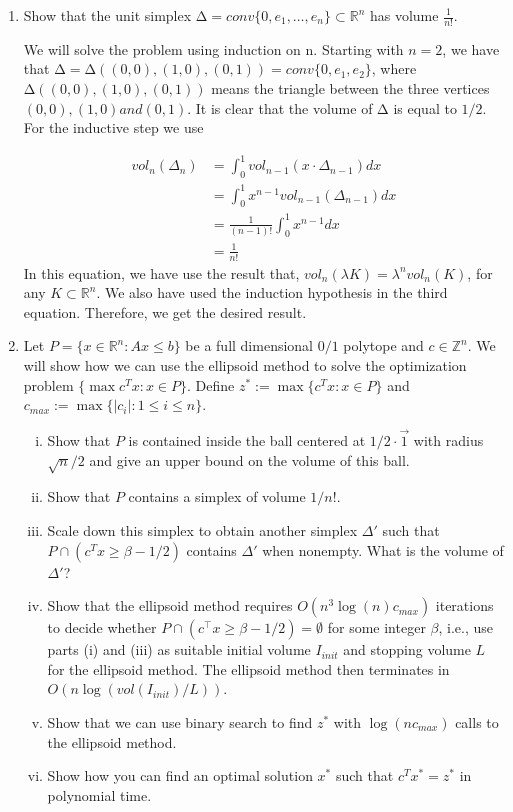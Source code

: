 \documentclass[11pt]{article}
\institute{\'Ecole Polytechnique F\'ed\'erale de Lausanne}
\newcommand{\setR}{\mathbb{R}}
\newcommand{\setZ}{\mathbb{Z}}
\renewcommand{\geq}{\geqslant}
\begin{document}
\makeheader

\begin{enumerate}[1)]

\item Show that the unit simplex $∆ = conv\{0,e_1,\hdots,e_n\}⊂\setR^n$ has volume $\frac{1}{n!}$.


\begin{solution}
We will solve the problem using induction on n. Starting with $n = 2$, we have that $∆ =
∆((0,0),(1,0),(0,1)) = conv \{0,e_1,e_2\}$, where $∆((0,0),(1,0),(0,1))$ means the triangle between
the three vertices $(0,0),(1,0) and (0,1)$. It is clear that the volume of $∆$ is equal to $1/2$.
For the inductive step we use

\begin{align*}
vol_n(\Delta_n) & = \int_0^1 vol_{n-1}(x\cdot \Delta_{n-1}) dx \\
& = \int_0^1 x^{n-1}vol_{n-1}(\Delta_{n-1}) dx \\
& = \frac{1}{(n-1)!}\int_0^1 x^{n-1}dx \\
& = \frac{1}{n!}
\end{align*}
In this equation, we have use the result that, $vol_n(λK) = λ^nvol_n(K)$, for any $K ⊂\setR^n$. We also
have used the induction hypothesis in the third equation. Therefore, we get the desired result.

\end{solution}



\item Let $P= \{x∈\setR^n : Ax≤b\}$ be a full dimensional $0/1$ polytope and $c ∈\setZ^n$. We will show how we
can use the ellipsoid method to solve the optimization problem $\{\max c^Tx: x∈P\}$.
Define $z^*:= \max \{c^Tx: x∈P\}$ and $c_{max} := \max \{|c_i|: 1 ≤i≤n\}$.
\begin{enumerate}[i)]
\item Show that $P$ is contained inside the ball centered at $1/2 \cdot \vec{1}$ with radius $\sqrt{n}/2$ and give an upper bound on the volume of this ball. 
\item Show that $P$ contains a simplex of volume $1/n!$.
\item Scale down this simplex to obtain another simplex $\Delta'$ such that $P \cap (c^Tx\geq \beta-1/2)$ contains $\Delta'$ when nonempty. What is the volume of $\Delta'$?
\item Show that the ellipsoid method requires $O(n^3 \log(n)c_{max})$ iterations to decide whether $P ∩
(c^⊤x≥β-1/2) = ∅$ for some integer $β$, i.e., use parts (i) and (iii) as suitable initial volume $I_{init}$ and stopping volume $L$ for the ellipsoid method. The ellipsoid method then terminates in $O(n \log(vol(I_{init})/L))$. 
\item Show that we can use binary search to find $z^*$ with $\log(nc_{max})$ calls to the ellipsoid method.
\item Show how you can find an optimal solution $x^*$ such that $c^Tx^*= z^*$ in polynomial time.
\end{enumerate}


\end{enumerate}
\end{document}
